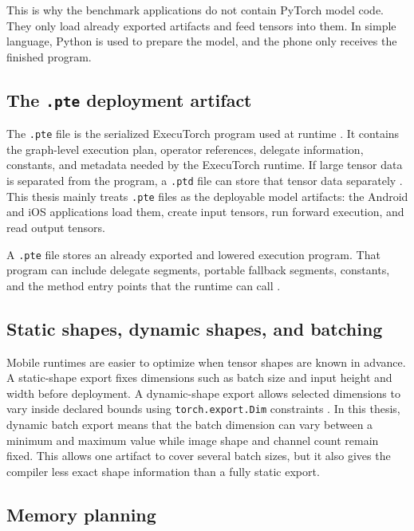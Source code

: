 This is why the benchmark applications do not contain PyTorch model code. They
only load already exported artifacts and feed tensors into them. In simple
language, Python is used to prepare the model, and the phone only receives the
finished program.

\subsection{The \texttt{.pte} deployment artifact}

The \texttt{.pte} file is the serialized ExecuTorch program used at runtime
\cite{executorch_pte}. It contains the graph-level execution plan, operator
references, delegate information, constants, and metadata needed by the
ExecuTorch runtime. If large tensor data is separated from the program, a
\texttt{.ptd} file can store that tensor data separately \cite{executorch_ptd}.
This thesis mainly treats \texttt{.pte} files as the deployable model artifacts:
the Android and iOS applications load them, create input tensors, run forward
execution, and read output tensors.

A \texttt{.pte} file stores an already exported and lowered execution program. 
That program can include delegate segments, portable fallback segments, constants, and the method entry points
that the runtime can call \cite{executorch_pte,executorch_delegate}.

\subsection{Static shapes, dynamic shapes, and batching}

Mobile runtimes are easier to optimize when tensor shapes are known in advance.
A static-shape export fixes dimensions such as batch size and input height and
width before deployment. A dynamic-shape export allows selected dimensions to
vary inside declared bounds using \texttt{torch.export.Dim} constraints
\cite{pytorch_export}. In this thesis, dynamic batch export means that the
batch dimension can vary between a minimum and maximum value while image shape
and channel count remain fixed. This allows one artifact to cover several batch
sizes, but it also gives the compiler less exact shape information than a fully
static export.

\subsection{Memory planning}

